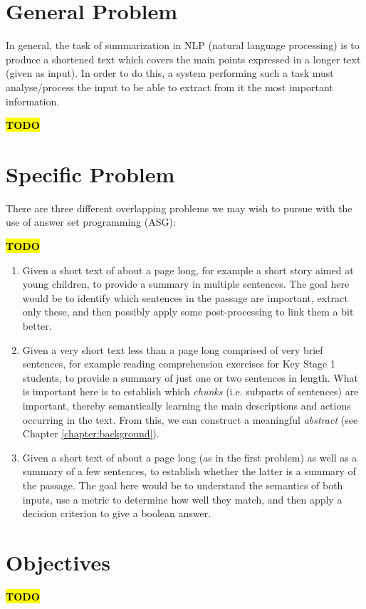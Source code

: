 \label{chapter:introduction}

\section{General Problem}

In general, the task of summarization in NLP (natural language processing) is to produce a shortened text which covers the main points expressed in a longer text (given as input). In order to do this, a system performing such a task must analyse/process the input to be able to extract from it the most important information.

\textcolor{red}{\textbf{\hl{TODO}}}

\section{Specific Problem}

There are three different overlapping problems we may wish to pursue with the use of answer set programming (ASG):

\textcolor{red}{\textbf{\hl{TODO}}}

\begin{enumerate}
\item Given a short text of about a page long, for example a short story aimed at young children, to provide a summary in multiple sentences. The goal here would be to identify which sentences in the passage are important, extract only these, and then possibly apply some post-processing to link them a bit better.
\item Given a very short text less than a page long comprised of very brief sentences, for example reading comprehension exercises for Key Stage 1 students, to provide a summary of just one or two sentences in length. What is important here is to establish which \textit{chunks} (i.e. subparts of sentences)  are important, thereby semantically learning the main descriptions and actions occurring in the text. From this, we can construct a meaningful \textit{abstract} (see Chapter \ref{chapter:background}).
\item Given a short text of about a page long (as in the first problem) as well as a summary of a few sentences, to establish whether the latter is a summary of the passage. The goal here would be to understand the semantics of both inputs, use a metric to determine how well they match, and then apply a decision criterion to give a boolean answer.
\end{enumerate}

\section{Objectives}

\textcolor{red}{\textbf{\hl{TODO}}}